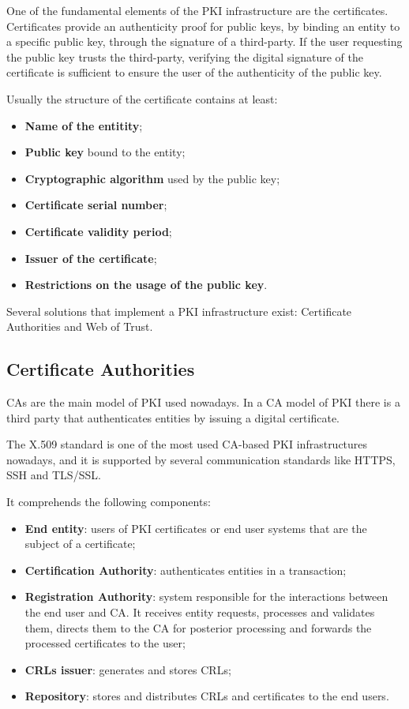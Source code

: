 One of the fundamental elements of the \ac{PKI} infrastructure are the certificates.
Certificates provide an authenticity proof for public keys, by binding an entity to a specific public key, through the signature of a third-party. If the user requesting the public key trusts the third-party, verifying the digital signature of the certificate is sufficient to ensure the user of the authenticity of the public key.

Usually the structure of the certificate contains at least:

\begin{itemize}
  \item \textbf{Name of the entitity};
  \item \textbf{Public key} bound to the entity;
  \item \textbf{Cryptographic algorithm} used by the public key;
  \item \textbf{Certificate serial number};
  \item \textbf{Certificate validity period};
  \item \textbf{Issuer of the certificate};
  \item \textbf{Restrictions on the usage of the public key}.
\end{itemize}

Several solutions that implement a \ac{PKI} infrastructure exist: Certificate Authorities and Web of Trust.

\subsection{Certificate Authorities}
\acp{CA} are the main model of \ac{PKI} used nowadays.
In a \ac{CA} model of \ac{PKI} there is a third party that authenticates entities by issuing a digital certificate.

The X.509 standard\cite{rfc5280}\cite{itut38895} is one of the most used \ac{CA}-based \ac{PKI} infrastructures nowadays, and it is supported by several communication standards like \acs{HTTPS}, \acs{SSH} and \acs{TLS}/\acs{SSL}.

It comprehends the following components:
\begin{itemize}
	\item \textbf{End entity}: users of \ac{PKI} certificates or end user systems that are the subject of a certificate;
	\item \textbf{Certification Authority}: authenticates entities in a transaction;
	\item \textbf{Registration Authority}: system responsible for the interactions between the end user and \ac{CA}. It receives entity requests, processes and validates them, directs them to the \ac{CA} for posterior processing and forwards the processed certificates to the user;
	\item \textbf{\acsp{CRL} issuer}: generates and stores \acp{CRL};
	\item \textbf{Repository}: stores and distributes \acp{CRL} and certificates to the end users.
\end{itemize}

